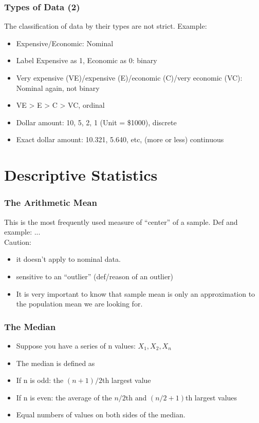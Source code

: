 \begin{frame} \frametitle{Types of Data (2)}
  The classification of data by their types are not strict. Example:
  \begin{itemize}
  \item Expensive/Economic: Nominal
  \item Label Expensive as 1, Economic as 0: binary
  \item Very expensive (VE)/expensive (E)/economic (C)/very economic (VC): Nominal again, not binary
  \item VE > E > C > VC, ordinal
  \item Dollar amount: 10, 5, 2, 1 (Unit = \$1000), discrete
  \item Exact dollar amount: 10.321, 5.640, etc, (more or less) continuous
  \end{itemize}
\end{frame}

\section{Descriptive Statistics}

\begin{frame} \frametitle{The Arithmetic Mean}
  This is the most frequently used measure of ``center'' of a sample.
  Def and example: ... \\
  Caution:
  \begin{itemize}
  \item it doesn't apply to nominal data.
  \item sensitive to an ``outlier'' (def/reason of an outlier)
  \item It is very important to know that sample mean is only an
    \alert{approximation} to the population mean we are looking for.
  \end{itemize}
\end{frame}

\begin{frame} \frametitle{The Median}
  \begin{itemize}
  \item Suppose you have a series of n values: $X_1, X_2,  X_n$
  \item The median is defined as
  \item If n is odd: the $(n+1)/2$th largest value
  \item If n is even: the average of the $n/2$th and $(n/2+1)$th largest values
  \item Equal numbers of values on both sides of the median.
  \end{itemize}
\end{frame}

